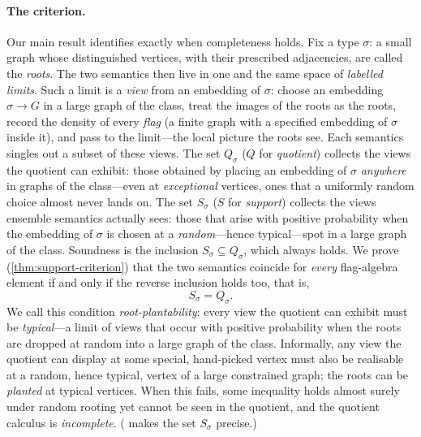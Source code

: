 \documentclass[11pt]{article}
\theoremstyle{definition}
\begin{document}
\paragraph{The criterion.}
Our main result identifies exactly when completeness holds.  Fix a type $\sigma$:
a small graph whose distinguished vertices, with their prescribed adjacencies, are
called the \emph{roots}.  The two semantics then live in one and the same space of
\emph{labelled limits}.  Such a limit is a \emph{view} from an embedding of $\sigma$:
choose an embedding $\sigma\to G$ in a large graph of the class, treat the images of the
roots as the roots, record the density of every \emph{flag} (a finite graph with a
specified embedding of $\sigma$ inside it), and pass to the limit---the local picture the
roots see.
Each semantics singles
out a subset of these views.  The set $Q_\sigma$ ($Q$ for \emph{quotient}) collects the
views the quotient can exhibit: those obtained by placing an embedding of $\sigma$
\emph{anywhere} in graphs of the class---even at \emph{exceptional} vertices, ones that a
uniformly random choice almost never lands on.  The set $S_\sigma$
($S$ for \emph{support}) collects the views ensemble semantics actually sees: those that
arise with positive probability when the embedding of $\sigma$ is chosen at a
\emph{random}---hence typical---spot in a large graph of the class.  Soundness is the
inclusion $S_\sigma\subseteq Q_\sigma$, which always holds.  We prove
(\cref{thm:support-criterion}) that the two semantics coincide for \emph{every}
flag-algebra element if and only if the reverse inclusion holds too, that is,
\[
  S_\sigma=Q_\sigma .
\]
We call this condition \emph{root-plantability}: every view the quotient can exhibit must
be \emph{typical}---a limit of views that occur with positive probability when the roots
are dropped at random into a large graph of the class.  Informally, any view the
quotient can display at some special, hand-picked vertex must also be realisable at a
random, hence typical, vertex of a large constrained graph; the roots can be
\emph{planted} at typical vertices.  When this fails, some inequality holds almost surely
under random rooting yet cannot be seen in the quotient, and the quotient calculus is
\emph{incomplete}.  ( makes the set $S_\sigma$ precise.)
\end{document}
